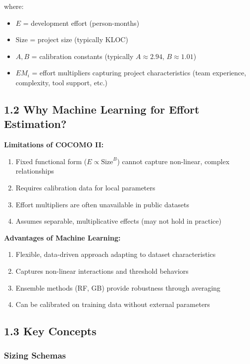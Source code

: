 \documentclass[11pt,a4paper]{article}
\begin{document}
where:
\begin{itemize}
    \item $E$ = development effort (person-months)
    \item $\text{Size}$ = project size (typically KLOC)
    \item $A, B$ = calibration constants (typically $A \approx 2.94$, $B \approx 1.01$)
    \item $EM_i$ = effort multipliers capturing project characteristics (team experience, complexity, tool support, etc.)
\end{itemize}

\subsection{1.2 Why Machine Learning for Effort Estimation?}

\textbf{Limitations of COCOMO II:}
\begin{enumerate}
    \item Fixed functional form ($E \propto \text{Size}^B$) cannot capture non-linear, complex relationships
    \item Requires calibration data for local parameters
    \item Effort multipliers are often unavailable in public datasets
    \item Assumes separable, multiplicative effects (may not hold in practice)
\end{enumerate}

\textbf{Advantages of Machine Learning:}
\begin{enumerate}
    \item Flexible, data-driven approach adapting to dataset characteristics
    \item Captures non-linear interactions and threshold behaviors
    \item Ensemble methods (RF, GB) provide robustness through averaging
    \item Can be calibrated on training data without external parameters
\end{enumerate}

\subsection{1.3 Key Concepts}

\subsubsection{Sizing Schemas}
\end{document}
